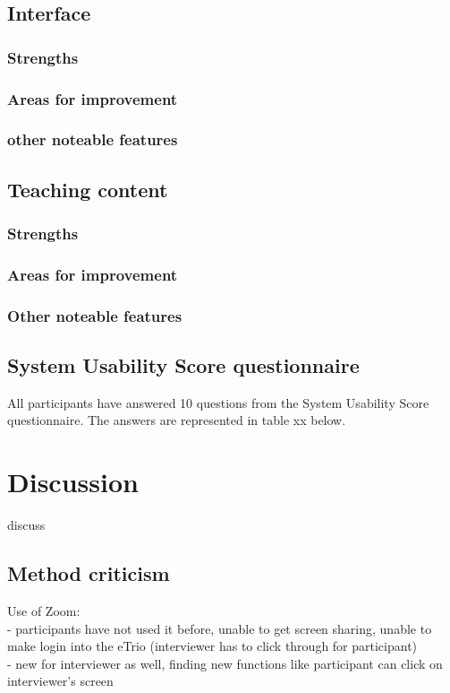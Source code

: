 \documentclass{sigchi}
\begin{document}
\subsection{Interface}
\subsubsection{Strengths}
\subsubsection{Areas for improvement}
\subsubsection{other noteable features}

\subsection{Teaching content}
\subsubsection{Strengths}
\subsubsection{Areas for improvement}
\subsubsection{Other noteable features}


\subsection{System Usability Score questionnaire}
All participants have answered 10 questions from the System Usability Score questionnaire. The answers are represented in table xx below. 

\section{Discussion}
discuss

\subsection{Method criticism}
Use of Zoom:\\
- participants have not used it before, unable to get screen sharing, unable to make login into the eTrio (interviewer has to click through for participant)\\
- new for interviewer as well, finding new functions like participant can click on interviewer's screen
\end{document}
